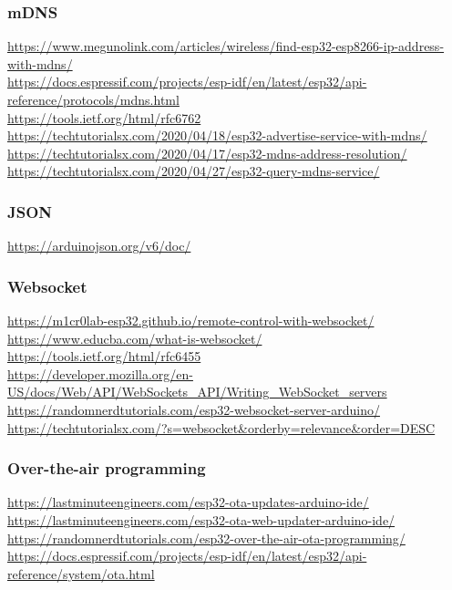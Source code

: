 \documentclass[11pt,a4paper]{article}
\numberwithin{equation}{section}   %
\numberwithin{figure}{section}     %
\numberwithin{table}{section}      %
\begin{document}
\subsubsection{mDNS}

\url{https://www.megunolink.com/articles/wireless/find-esp32-esp8266-ip-address-with-mdns/}\\[4pt]
\url{https://docs.espressif.com/projects/esp-idf/en/latest/esp32/api-reference/protocols/mdns.html}\\[4pt]
\url{https://tools.ietf.org/html/rfc6762}\\[4pt]
\url{https://techtutorialsx.com/2020/04/18/esp32-advertise-service-with-mdns/}\\[4pt]
\url{https://techtutorialsx.com/2020/04/17/esp32-mdns-address-resolution/}\\[4pt]
\url{https://techtutorialsx.com/2020/04/27/esp32-query-mdns-service/}

\subsubsection{JSON}

\url{https://arduinojson.org/v6/doc/}

\subsubsection{Websocket}

\url{https://m1cr0lab-esp32.github.io/remote-control-with-websocket/}\\[4pt]
\url{https://www.educba.com/what-is-websocket/}\\[4pt]
\url{https://tools.ietf.org/html/rfc6455}\\[4pt]
\url{https://developer.mozilla.org/en-US/docs/Web/API/WebSockets_API/Writing_WebSocket_servers}\\[4pt]
\url{https://randomnerdtutorials.com/esp32-websocket-server-arduino/}\\[4pt]
\url{https://techtutorialsx.com/?s=websocket&orderby=relevance&order=DESC}

\subsubsection{Over-the-air programming}

\url{https://lastminuteengineers.com/esp32-ota-updates-arduino-ide/}\\[4pt]
\url{https://lastminuteengineers.com/esp32-ota-web-updater-arduino-ide/}\\[4pt]
\url{https://randomnerdtutorials.com/esp32-over-the-air-ota-programming/}\\[4pt]
\url{https://docs.espressif.com/projects/esp-idf/en/latest/esp32/api-reference/system/ota.html}
\end{document}
